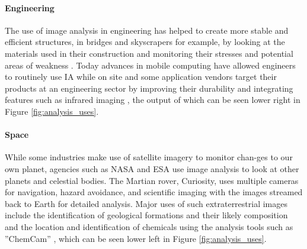 		\paragraph{Engineering}
			The use of image analysis in engineering has helped to create more stable and efficient structures, in bridges and skyscrapers for example, by looking at the materials used in their construction \citep{concreteanalysis} and monitoring their stresses and potential areas of weakness \citep{bridgecables}. Today advances in mobile computing have allowed engineers to routinely use IA while on site and some application vendors target their products at an engineering sector by improving their durability and integrating features such as infrared imaging \citep{catphone}, the output of which can be seen lower right in Figure \ref{fig:analysis_uses}.
		\paragraph{Space}
			While some industries make use of satellite imagery to monitor 
			chan-ges to our own planet, agencies such as NASA and ESA use image analysis to look at other planets and celestial bodies. The Martian rover, Curiosity, uses multiple cameras for navigation, hazard avoidance, and scientific imaging with the images streamed back to Earth for detailed analysis. Major uses of such extraterrestrial images include the identification of geological formations and their likely composition \citep{curiositysand, curiositygravel} and the location and identification of chemicals using the analysis tools such as ”ChemCam” \citep{curiosityhydrogen}, which can be seen lower left in Figure \ref{fig:analysis_uses}.
